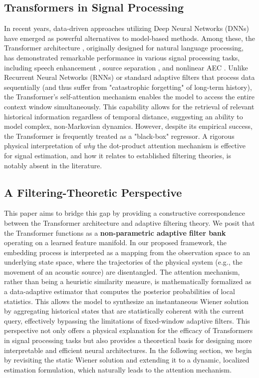 \documentclass[conference]{IEEEtran}
\begin{document}
\subsection{Transformers in Signal Processing}
In recent years, data-driven approaches utilizing Deep Neural Networks (DNNs) have emerged as powerful alternatives to model-based methods. Among these, the Transformer architecture \cite{vaswani2017attention}, originally designed for natural language processing, has demonstrated remarkable performance in various signal processing tasks, including speech enhancement \cite{wang2020complex}, source separation \cite{subakan2021attention}, and nonlinear AEC \cite{zhang2022multi}.
Unlike Recurrent Neural Networks (RNNs) or standard adaptive filters that process data sequentially (and thus suffer from "catastrophic forgetting" of long-term history), the Transformer's self-attention mechanism enables the model to access the entire context window simultaneously. This capability allows for the retrieval of relevant historical information regardless of temporal distance, suggesting an ability to model complex, non-Markovian dynamics. However, despite its empirical success, the Transformer is frequently treated as a "black-box" regressor. A rigorous physical interpretation of \textit{why} the dot-product attention mechanism is effective for signal estimation, and how it relates to established filtering theories, is notably absent in the literature.
\subsection{A Filtering-Theoretic Perspective}
This paper aims to bridge this gap by providing a constructive correspondence between the Transformer architecture and adaptive filtering theory. We posit that the Transformer functions as a \textbf{non-parametric adaptive filter bank} operating on a learned feature manifold.
In our proposed framework, the embedding process is interpreted as a mapping from the observation space to an underlying state space, where the trajectories of the physical system (e.g., the movement of an acoustic source) are disentangled. The attention mechanism, rather than being a heuristic similarity measure, is mathematically formalized as a data-adaptive estimator that computes the posterior probabilities of local statistics. This allows the model to synthesize an instantaneous Wiener solution by aggregating historical states that are statistically coherent with the current query, effectively bypassing the limitations of fixed-window adaptive filters.
This perspective not only offers a physical explanation for the efficacy of Transformers in signal processing tasks but also provides a theoretical basis for designing more interpretable and efficient neural architectures. In the following section, we begin by revisiting the static Wiener solution and extending it to a dynamic, localized estimation formulation, which naturally leads to the attention mechanism.
\end{document}
